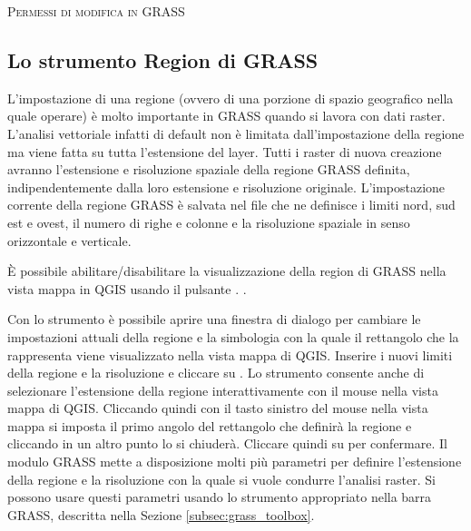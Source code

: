 \begin{Tip}\caption{\textsc{Permessi di modifica in GRASS}}
\end{Tip} 

\subsection{Lo strumento Region di GRASS}\label{sec:grass_region}

L'impostazione di una regione (ovvero di una porzione di spazio geografico
nella quale operare) è molto importante in GRASS quando si lavora con dati
raster. L'analisi vettoriale infatti di default non è limitata
dall'impostazione della regione ma viene fatta su tutta l'estensione del
layer. Tutti i raster di nuova creazione avranno l'estensione e risoluzione
spaziale della regione GRASS definita, indipendentemente dalla loro estensione
e risoluzione originale. L'impostazione corrente della regione GRASS è salvata
nel file  che ne definisce i limiti nord, sud
est e ovest, il numero di righe e colonne e la risoluzione spaziale in senso
orizzontale e verticale.

È possibile abilitare/disabilitare la visualizzazione della region di GRASS
nella vista mappa in QGIS usando il pulsante . .

Con lo strumento 
è possibile aprire una finestra di dialogo per cambiare le impostazioni
attuali della regione e la simbologia con la quale il rettangolo che la
rappresenta viene visualizzato nella vista mappa di QGIS. Inserire i nuovi
limiti della regione e la risoluzione e cliccare su . Lo strumento
consente anche di selezionare l'estensione della regione interattivamente con
il mouse nella vista mappa di QGIS. Cliccando quindi con il tasto sinistro del
mouse nella vista mappa si imposta il primo angolo del rettangolo che definirà
la regione e cliccando in un altro punto lo si chiuderà. Cliccare quindi su
 per confermare.
Il modulo GRASS  mette a disposizione molti più parametri
per definire l'estensione della regione e la risoluzione con la quale si vuole
condurre l'analisi raster. Si possono usare questi parametri usando lo
strumento appropriato nella barra GRASS, descritta nella Sezione \ref{subsec:grass_toolbox}.

